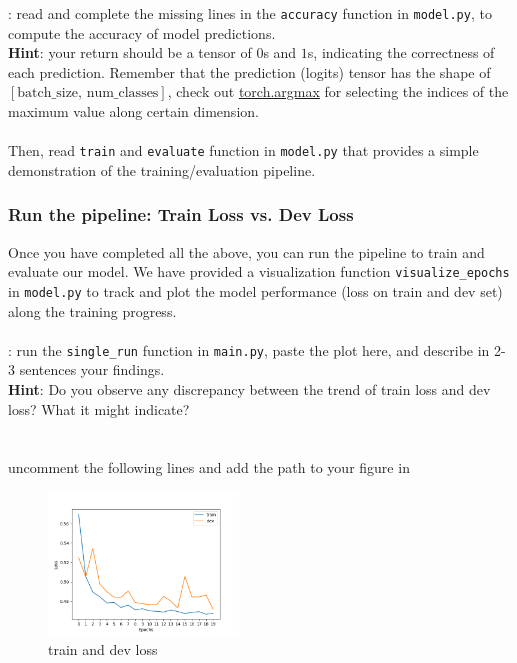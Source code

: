     \noindent \todo{}: read and complete the missing lines in the \texttt{accuracy} function in \texttt{model.py}, to compute the accuracy of model predictions.\\
    \noindent \textbf{Hint}: your return should be a tensor of $0$s and $1$s, indicating the correctness of each prediction. Remember that the prediction (logits) tensor has the shape of $[\text{batch\_size}, \, \text{num\_classes}]$, check out \href{https://pytorch.org/docs/stable/generated/torch.argmax.html}{torch.argmax} for selecting the indices of the maximum value along certain dimension.\\\\
    Then, read \texttt{train} and \texttt{evaluate} function in \texttt{model.py} that provides a simple demonstration of the training/evaluation pipeline.

    \subsubsection{Run the pipeline: Train Loss vs. Dev Loss}
    Once you have completed all the \todo{} above, you can run the pipeline to train and evaluate our model. We have provided a visualization function \texttt{visualize\_epochs} in \texttt{model.py} to track and plot the model performance (loss on train and dev set) along the training progress.\\\\
    \noindent \todo{}: run the \texttt{single\_run} function in \texttt{main.py}, paste the plot here, and describe in 2-3 sentences your findings.\\
    \noindent \textbf{Hint}: Do you observe any discrepancy between the trend of train loss and dev loss? What it might indicate?
    \\\\
    \noindent {\color{red}{your plots and answer:}}\\
    uncomment the following lines and add the path to your figure in {}
    \begin{figure}[h]
       \centering
       \includegraphics[width=0.45\textwidth]{single_run_loss.png}
       \caption{train and dev loss}
    \end{figure}

